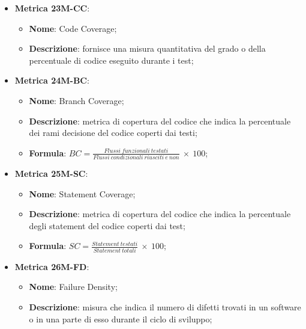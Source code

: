 \begin{itemize}
    \item \textbf{Metrica 23M-CC}:
    \begin{itemize}
        \item \textbf{Nome}: Code Coverage;
        \item \textbf{Descrizione}: fornisce una misura quantitativa del grado o della percentuale di codice eseguito durante i test;
    \end{itemize}
\end{itemize}

\begin{itemize}
    \item \textbf{Metrica 24M-BC}:
    \begin{itemize}
        \item \textbf{Nome}: Branch Coverage;
        \item \textbf{Descrizione}: metrica di copertura del codice che indica la percentuale dei rami decisione del codice coperti dai testi;
        \item \textbf{Formula}: $BC =\frac{Flussi\:funzionali\: testati}{Flussi\:condizionali\: riusciti\: e\: non}\: \times \: 100$;
    \end{itemize}
\end{itemize}

\begin{itemize}
    \item \textbf{Metrica 25M-SC}:
    \begin{itemize}
        \item \textbf{Nome}: Statement Coverage;
        \item \textbf{Descrizione}: metrica di copertura del codice che indica la percentuale degli statement del codice coperti dai test;
        \item \textbf{Formula}: $SC = \frac{Statement\: testati}{Statement\: totali}\: \times \: 100$;
    \end{itemize}
\end{itemize}

\begin{itemize}
    \item \textbf{Metrica 26M-FD}:
    \begin{itemize}
        \item \textbf{Nome}: Failure Density;
        \item \textbf{Descrizione}: misura che indica il numero di difetti trovati in un software o in una parte di esso durante il ciclo di sviluppo;
    \end{itemize}
\end{itemize}

